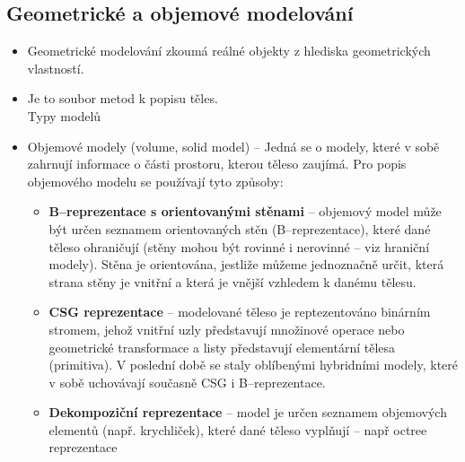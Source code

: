 
\subsection{Geometrické a objemové modelování}
\begin{itemize}
	\item Geometrické modelování zkoumá reálné objekty z hlediska geometrických vlastností.
	\item Je to soubor metod k popisu těles. \\ Typy modelů
	\item Objemové modely (volume, solid model) -- Jedná se o modely, které v sobě zahrnují informace o části prostoru, kterou těleso zaujímá. Pro popis objemového modelu se používají tyto způsoby:
	\begin{itemize}
		\item \textbf{B--reprezentace s orientovanými stěnami} -- objemový model může být určen seznamem orientovaných stěn (B--reprezentace), které dané těleso ohraničují (stěny mohou být rovinné i nerovinné -- viz hraniční modely). Stěna je orientována, jestliže můžeme jednoznačně určit, která strana stěny je vnitřní a která je vnější vzhledem k danému tělesu.
		\item \textbf{CSG reprezentace} -- modelované těleso je reptezentováno binárním stromem, jehož vnitřní uzly představují množinové operace nebo geometrické transformace a listy představují elementární tělesa (primitiva). V poslední době se staly oblíbenými hybridními modely, které v sobě uchovávají současně CSG i B--reprezentace.
		\item \textbf{Dekompoziční reprezentace} -- model je určen seznamem objemových elementů (např. krychliček), které dané těleso vyplňují -- např octree reprezentace
\end{itemize}
\end{itemize}

